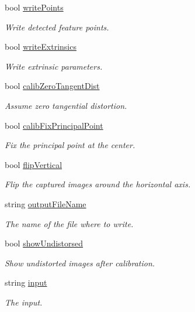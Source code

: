 \begin{DoxyCompactItemize}
bool \mbox{\hyperlink{class_settings_a53ac449815682c6bfae7e50944ba0565}{write\+Points}}
\begin{DoxyCompactList}\small\item\em Write detected feature points. \end{DoxyCompactList}\item 
bool \mbox{\hyperlink{class_settings_a1cee56847e08f49c90d2f7e2b0511197}{write\+Extrinsics}}
\begin{DoxyCompactList}\small\item\em Write extrinsic parameters. \end{DoxyCompactList}\item 
bool \mbox{\hyperlink{class_settings_a4bc7ff147d74721a3587ce6fcb64ef32}{calib\+Zero\+Tangent\+Dist}}
\begin{DoxyCompactList}\small\item\em Assume zero tangential distortion. \end{DoxyCompactList}\item 
bool \mbox{\hyperlink{class_settings_a44397eea3f08a0c78808c38bdd716594}{calib\+Fix\+Principal\+Point}}
\begin{DoxyCompactList}\small\item\em Fix the principal point at the center. \end{DoxyCompactList}\item 
bool \mbox{\hyperlink{class_settings_ab6304f260b315d2820f755e1c3a052b5}{flip\+Vertical}}
\begin{DoxyCompactList}\small\item\em Flip the captured images around the horizontal axis. \end{DoxyCompactList}\item 
string \mbox{\hyperlink{class_settings_a9468f1ad53e982f9541d76c8d3228900}{output\+File\+Name}}
\begin{DoxyCompactList}\small\item\em The name of the file where to write. \end{DoxyCompactList}\item 
bool \mbox{\hyperlink{class_settings_a935d6f27ee454e9fee63f8b662f48a06}{show\+Undistorsed}}
\begin{DoxyCompactList}\small\item\em Show undistorted images after calibration. \end{DoxyCompactList}\item 
string \mbox{\hyperlink{class_settings_a9970d51ab47b6560ab11b267637b6219}{input}}
\begin{DoxyCompactList}\small\item\em The input. \end{DoxyCompactList}\item 

\end{DoxyCompactItemize}
